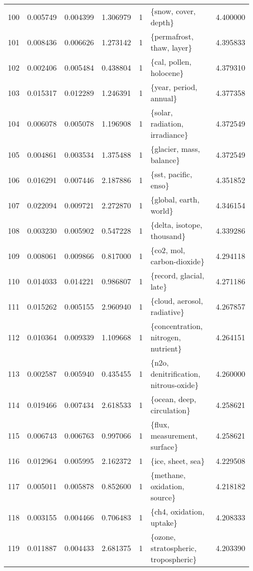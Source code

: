 \begin{tabular}{lrrrrlr}
100 &    0.005749 &  0.004399 &        1.306979 &           1 &                    \{snow, cover, depth\} &  4.400000 \\
101 &    0.008436 &  0.006626 &        1.273142 &           1 &               \{permafrost, thaw, layer\} &  4.395833 \\
102 &    0.002406 &  0.005484 &        0.438804 &           1 &                 \{cal, pollen, holocene\} &  4.379310 \\
103 &    0.015317 &  0.012289 &        1.246391 &           1 &                  \{year, period, annual\} &  4.377358 \\
104 &    0.006078 &  0.005078 &        1.196908 &           1 &          \{solar, radiation, irradiance\} &  4.372549 \\
105 &    0.004861 &  0.003534 &        1.375488 &           1 &                \{glacier, mass, balance\} &  4.372549 \\
106 &    0.016291 &  0.007446 &        2.187886 &           1 &                    \{sst, pacific, enso\} &  4.351852 \\
107 &    0.022094 &  0.009721 &        2.272870 &           1 &                  \{global, earth, world\} &  4.346154 \\
108 &    0.003230 &  0.005902 &        0.547228 &           1 &              \{delta, isotope, thousand\} &  4.339286 \\
109 &    0.008061 &  0.009866 &        0.817000 &           1 &              \{co2, mol, carbon-dioxide\} &  4.294118 \\
110 &    0.014033 &  0.014221 &        0.986807 &           1 &                 \{record, glacial, late\} &  4.271186 \\
111 &    0.015262 &  0.005155 &        2.960940 &           1 &             \{cloud, aerosol, radiative\} &  4.267857 \\
112 &    0.010364 &  0.009339 &        1.109668 &           1 &     \{concentration, nitrogen, nutrient\} &  4.264151 \\
113 &    0.002587 &  0.005940 &        0.435455 &           1 &   \{n2o, denitrification, nitrous-oxide\} &  4.260000 \\
114 &    0.019466 &  0.007434 &        2.618533 &           1 &              \{ocean, deep, circulation\} &  4.258621 \\
115 &    0.006743 &  0.006763 &        0.997066 &           1 &            \{flux, measurement, surface\} &  4.258621 \\
116 &    0.012964 &  0.005995 &        2.162372 &           1 &                       \{ice, sheet, sea\} &  4.229508 \\
117 &    0.005011 &  0.005878 &        0.852600 &           1 &            \{methane, oxidation, source\} &  4.218182 \\
118 &    0.003155 &  0.004466 &        0.706483 &           1 &                \{ch4, oxidation, uptake\} &  4.208333 \\
119 &    0.011887 &  0.004433 &        2.681375 &           1 &    \{ozone, stratospheric, tropospheric\} &  4.203390 \\
\bottomrule
\end{tabular}
